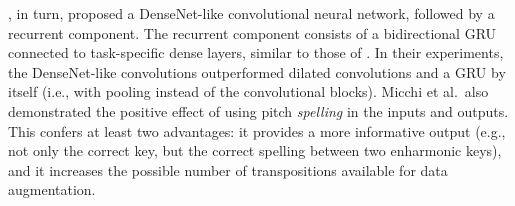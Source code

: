 \textcite{micchi2020not}, in turn, proposed a DenseNet-like
\parencite{huang2017densely} convolutional neural network,
followed by a recurrent component. The recurrent component
consists of a bidirectional GRU \parencite{cho2014learning}
connected to task-specific dense layers, similar to those of
\textcite{chen2018functional}. In their
experiments, the DenseNet-like convolutions outperformed
dilated convolutions and a GRU by itself (i.e., with pooling
instead of the convolutional blocks). Micchi et al.~also
demonstrated the positive effect of using pitch
\textit{spelling} in the inputs and outputs. This confers at
least two advantages: it provides a more informative output
(e.g., not only the correct key, but the correct spelling
between two enharmonic keys), and it increases the possible
number of transpositions available for data augmentation.
